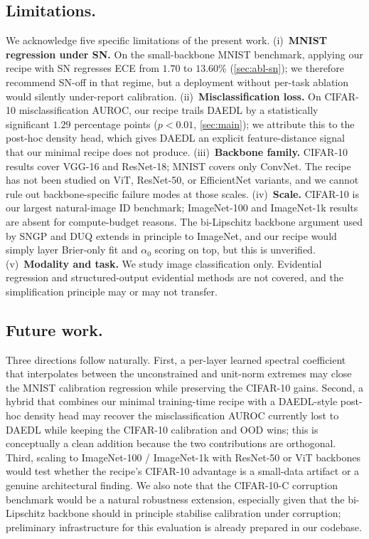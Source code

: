 \documentclass[review,5p,times]{elsarticle}
\begin{document}
\subsection{Limitations.}\label{sec:disc-limits}
We acknowledge five specific limitations of the present work.
(i)~\textbf{MNIST regression under SN.} On the small-backbone MNIST
benchmark, applying our recipe with SN regresses ECE from $1.70$ to
$13.60\%$ (\autoref{sec:abl-sn}); we therefore recommend SN-off in that
regime, but a deployment without per-task ablation would silently
under-report calibration. (ii)~\textbf{Misclassification loss.} On
CIFAR-10 misclassification AUROC, our recipe trails DAEDL by a
statistically significant $1.29$ percentage points
($p\!<\!0.01$, \autoref{sec:main}); we attribute this to the
post-hoc density head, which gives DAEDL an explicit feature-distance
signal that our minimal recipe does not produce.
(iii)~\textbf{Backbone family.} CIFAR-10 results cover VGG-16 and
ResNet-18; MNIST covers only ConvNet. The recipe has not been studied on
ViT, ResNet-50, or EfficientNet variants, and we cannot rule out
backbone-specific failure modes at those scales. (iv)~\textbf{Scale.}
CIFAR-10 is our largest natural-image ID benchmark; ImageNet-100 and
ImageNet-1k results are absent for compute-budget reasons. The
bi-Lipschitz backbone argument used by SNGP and DUQ extends in principle
to ImageNet, and our recipe would simply layer Brier-only fit and
$\alpha_0$ scoring on top, but this is unverified. (v)~\textbf{Modality
and task.} We study image classification only. Evidential regression
\citep{amini2020evidential} and structured-output evidential methods are
not covered, and the simplification principle may or may not transfer.

\subsection{Future work.}\label{sec:disc-future}
Three directions follow naturally. First, a per-layer learned spectral
coefficient that interpolates between the unconstrained and unit-norm
extremes may close the MNIST calibration regression while preserving the
CIFAR-10 gains. Second, a hybrid that combines our minimal training-time
recipe with a DAEDL-style post-hoc density head may recover the
misclassification AUROC currently lost to DAEDL while keeping the
CIFAR-10 calibration and OOD wins; this is conceptually a clean
addition because the two contributions are orthogonal. Third, scaling to
ImageNet-100 / ImageNet-1k with ResNet-50 or ViT backbones would test
whether the recipe's CIFAR-10 advantage is a small-data artifact or a
genuine architectural finding. We also note that the CIFAR-10-C
corruption benchmark \citep{hendrycks2017baseline} would be a natural
robustness extension, especially given that the bi-Lipschitz backbone
should in principle stabilise calibration under corruption; preliminary
infrastructure for this evaluation is already prepared in our codebase.
\end{document}
